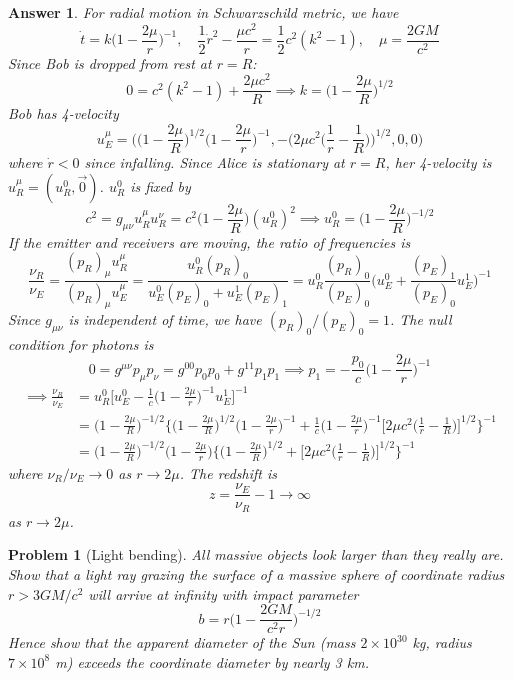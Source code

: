 \documentclass[a4paper]{article}
\theoremstyle{new2}
\newtheorem{ans}{Answer}[section]
\theoremstyle{new}
\newtheorem{qns}{Problem}[section]
\begin{document}
\begin{ans}
For radial motion in Schwarzschild metric, we have
$$\dot{t}=k\bigg(1-\frac{2\mu}{r}\bigg)^{-1},\quad\frac{1}{2}\dot{r}^2-\frac{\mu c^2}{r}=\frac{1}{2}c^2(k^2-1),\quad\mu=\frac{2GM}{c^2}$$
Since Bob is dropped from rest at $r=R$:
$$0=c^2(k^2-1)+\frac{2\mu c^2}{R}\implies k=\bigg(1-\frac{2\mu}{R}\bigg)^{1/2}$$
Bob has 4-velocity
$$u_E^\mu=\bigg(\bigg(1-\frac{2\mu}{R}\bigg)^{1/2}\bigg(1-\frac{2\mu}{r}\bigg)^{-1},-\bigg(2\mu c^2\bigg(\frac{1}{r}-\frac{1}{R}\bigg)\bigg)^{1/2},0,0\bigg)$$
where $\dot{r}<0$ since infalling. Since Alice is stationary at $r=R$, her 4-velocity is $u_R^\mu=(u_R^0,\vec{0})$. $u_R^0$ is fixed by
$$c^2=g_{\mu\nu}u_R^\mu u_R^\nu=c^2\bigg(1-\frac{2\mu}{R}\bigg)(u_R^0)^2\implies u_R^0=\bigg(1-\frac{2\mu}{R}\bigg)^{-1/2}$$
If the emitter and receivers are moving, the ratio of frequencies is
$$\frac{\nu_R}{\nu_E}=\frac{(p_R)_\mu u^\mu_R}{(p_R)_\mu u^\mu_E}=\frac{u_R^0(p_R)_0}{u_E^0(p_E)_0+u_E^1(p_E)_1}=u_R^0\frac{(p_R)_0}{(p_E)_0}\bigg(u_E^0+\frac{(p_E)_1}{(p_E)_0}u_E^1\bigg)^{-1}$$
Since $g_{\mu\nu}$ is independent of time, we have $(p_R)_0/(p_E)_0=1$. The null condition for photons is
$$0=g^{\mu\nu}p_\mu p_\nu=g^{00}p_0p_0+g^{11}p_1p_1\implies p_1=-\frac{p_0}{c}\bigg(1-\frac{2\mu}{r}\bigg)^{-1}$$
\begin{align}
    \implies\frac{\nu_R}{\nu_E}&=u_R^0\bigg[u_E^0-\frac{1}{c}\bigg(1-\frac{2\mu}{r}\bigg)^{-1}u_E^1\bigg]^{-1}\nonumber\\&=\bigg(1-\frac{2\mu}{R}\bigg)^{-1/2}\bigg\{\bigg(1-\frac{2\mu}{R}\bigg)^{1/2}\bigg(1-\frac{2\mu}{r}\bigg)^{-1}+\frac{1}{c}\bigg(1-\frac{2\mu}{r}\bigg)^{-1}\bigg[2\mu c^2\bigg(\frac{1}{r}-\frac{1}{R}\bigg)\bigg]^{1/2}\bigg\}^{-1}\nonumber\\&=\bigg(1-\frac{2\mu}{R}\bigg)^{-1/2}\bigg(1-\frac{2\mu}{r}\bigg)\bigg\{\bigg(1-\frac{2\mu}{R}\bigg)^{1/2}+\bigg[2\mu c^2\bigg(\frac{1}{r}-\frac{1}{R}\bigg)\bigg]^{1/2}\bigg\}^{-1}\nonumber
\end{align}
where $\nu_R/\nu_E\rightarrow 0$ as $r\rightarrow 2\mu$. The redshift is
$$z=\frac{\nu_E}{\nu_R}-1\rightarrow\infty$$
as $r\rightarrow2\mu$.
\end{ans}
\newpage
\begin{qns}[Light bending]
All massive objects look larger than they really are. Show that a light ray grazing the surface of a massive sphere of coordinate radius $r > 3GM/c^2$ will arrive at infinity with impact parameter
$$b=r\bigg(1-\frac{2GM}{c^2r}\bigg)^{-1/2}$$
Hence show that the apparent diameter of the Sun (mass $2\times10^{30}$ kg, radius  $7\times10^8$ m) exceeds the coordinate diameter by nearly 3 km.
\end{qns}
\end{document}

